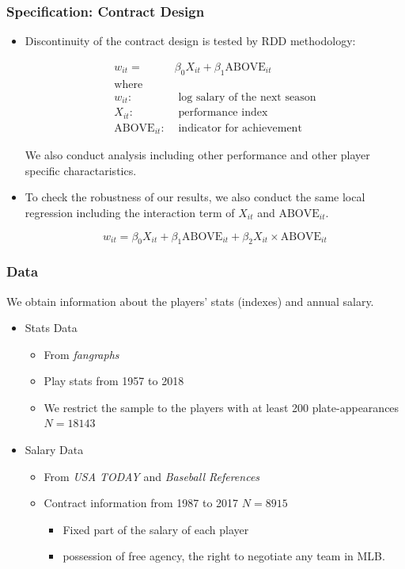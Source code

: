 \documentclass[dvipdfmx,12pt]{beamer}
\begin{document}
\begin{frame}\frametitle{Specification: Contract Design}
  \begin{itemize}
    \small
    \item Discontinuity of the contract design is tested by RDD methodology:

    \begin{align*}
      w_{it} = & \beta_0 X_{it} + \beta_1 \text{ABOVE}_{it} \\
      \text{where} \\
      w_{it}: & \text{ log salary of the next season} \\
      X_{it}: & \text{ performance index} \\
      \text{ABOVE}_{it}: & \text{ indicator for achievement}
    \end{align*}

    We also conduct analysis including other performance and other player specific charactaristics.

    \item To check the robustness of our results, we also conduct the same local regression including the interaction term of $X_{it}$ and $\text{ABOVE}_{it}$.

    \[
    w_{it} = \beta_0 X_{it} + \beta_1 \text{ABOVE}_{it} + \beta_2 X_{it} \times \text{ABOVE}_{it}
    \]

  \end{itemize}
\end{frame}

\begin{frame}\frametitle{Data}
  We obtain information about the players' stats (indexes) and annual salary.
  \begin{itemize}
    \item Stats Data
    \begin{itemize}
      \item From \textit{fangraphs}

      \item Play stats from 1957 to 2018

      \item We restrict the sample to the players with at least 200 plate-appearances $N=18143$
    \end{itemize}
    \item Salary Data
    \begin{itemize}
      \item From \textit{USA TODAY} and \textit{Baseball References}

      \item Contract information from 1987 to 2017 $N=8915$
      \begin{itemize}
        \item Fixed part of the salary of each player

        \item possession of free agency, the right to negotiate any team in MLB.
      \end{itemize}
    \end{itemize}
  \end{itemize}
\end{frame}
\end{document}
